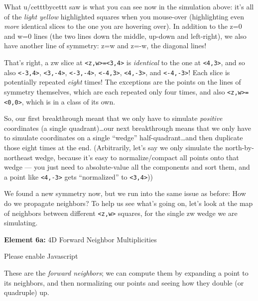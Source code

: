 \documentclass[]{article}
\begin{document}
What u/cetttbycettt saw is what you can see now in the simulation above: it's
all of the \emph{light yellow} highlighted squares when you mouse-over
(highlighting even \emph{more} identical slices to the one you are hovering
over). In addition to the z=0 and w=0 lines (the two lines down the middle,
up-down and left-right), we also have another line of symmetry: z=w and z=-w,
the diagonal lines!

That's right, a zw slice at
\texttt{\textless{}z,w\textgreater{}=\textless{}3,4\textgreater{}} is
\emph{identical} to the one at \texttt{\textless{}4,3\textgreater{}}, and so
also \texttt{\textless{}-3,4\textgreater{}},
\texttt{\textless{}3,-4\textgreater{}}, \texttt{\textless{}-3,-4\textgreater{}},
\texttt{\textless{}-4,3\textgreater{}}, \texttt{\textless{}4,-3\textgreater{}},
and \texttt{\textless{}-4,-3\textgreater{}}! Each slice is potentially repeated
\emph{eight} times! The exceptions are the points on the lines of symmetry
themselves, which are each repeated only four times, and also
\texttt{\textless{}z,w\textgreater{}=\textless{}0,0\textgreater{}}, which is in
a class of its own.

So, our first breakthrough meant that we only have to simulate \emph{positive}
coordinates (a single quadrant)\ldots our next breakthrough means that we only
have to simulate coordinates on a single ``wedge'' half-quadrant\ldots and then
duplicate those eight times at the end. (Arbitrarily, let's say we only simulate
the north-by-northeast wedge, because it's easy to normalize/compact all points
onto that wedge --- you just need to absolute-value all the components and sort
them, and a point like \texttt{\textless{}4,-3\textgreater{}} gets
``normalized'' to \texttt{\textless{}3,4\textgreater{}}))

We found a new symmetry now, but we run into the same issue as before: How do we
propagate neighbors? To help us see what's going on, let's look at the map of
neighbors between different \texttt{\textless{}z,w\textgreater{}} squares, for
the single zw wedge we are simulating.

\leavevmode\hypertarget{golSyms4DForward}{}%
\textbf{Element 6a:} 4D Forward Neighbor Multiplicities

\leavevmode\hypertarget{golSyms4DForwardCont}{}%
Please enable Javascript

These are the \emph{forward neighbors}; we can compute them by expanding a point
to its neighbors, and then normalizing our points and seeing how they double (or
quadruple) up.
\end{document}

